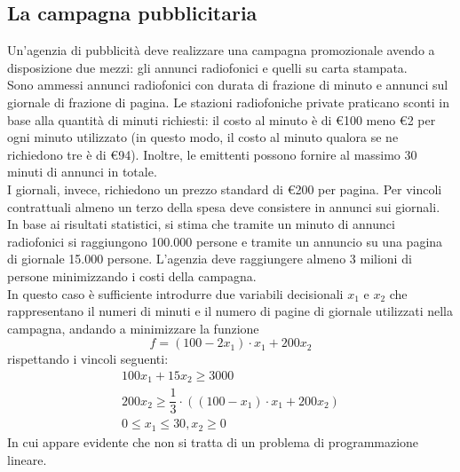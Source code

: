 \documentclass[a4paper]{extarticle}
\begin{document}
\subsection{La campagna pubblicitaria}
Un'agenzia di pubblicità deve realizzare una campagna promozionale avendo a disposizione due mezzi: gli annunci radiofonici e quelli su carta stampata.\\
Sono ammessi annunci radiofonici con durata di frazione di minuto e annunci sul giornale di frazione di pagina. Le stazioni radiofoniche private praticano sconti in base alla quantità di minuti richiesti: il costo al minuto è di €100 meno €2 per ogni minuto utilizzato (in questo modo, il costo al minuto qualora se ne richiedono tre è di €94). Inoltre, le emittenti possono fornire al massimo 30 minuti di annunci in totale.\\
I giornali, invece, richiedono un prezzo standard di €200 per pagina. Per vincoli contrattuali almeno un terzo della spesa deve consistere in annunci sui giornali. In base ai risultati statistici, si stima che tramite un minuto di annunci radiofonici si raggiungono 100.000 persone e tramite un annuncio su una pagina di giornale 15.000 persone. L'agenzia deve raggiungere almeno 3 milioni di persone minimizzando i costi della campagna.\\
In questo caso è sufficiente introdurre due variabili decisionali $x_1$ e $x_2$ che rappresentano il numeri di minuti e il numero di pagine di giornale utilizzati nella campagna, andando a minimizzare la funzione
\[f = (100 - 2x_1) \cdot x_1 + 200 x_2\]
rispettando i vincoli seguenti:
\begin{align*}
    100 x_1 + 15 x_2 \geq 3000\\
    200 x_2 \geq \dfrac{1}{3} \cdot \left((100-x_1) \cdot x_1 + 200x_2\right)\\
    0 \leq x_1 \leq 30, x_2 \geq 0
\end{align*}
In cui appare evidente che non si tratta di un problema di programmazione lineare.


\vspace{1em}
\noindent
\end{document}

